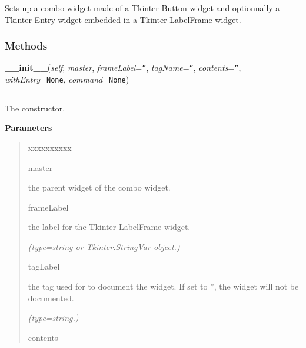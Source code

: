 Sets up a combo widget made of a Tkinter Button widget and optionnally a 
Tkinter Entry widget embedded in a Tkinter LabelFrame widget.



  \subsubsection{Methods}

    \vspace{0.5ex}

\hspace{.8\funcindent}\begin{boxedminipage}{\funcwidth}

    \raggedright \textbf{\_\_init\_\_}(\textit{self}, \textit{master}, \textit{frameLabel}={\tt ''}, \textit{tagName}={\tt ''}, \textit{contents}={\tt ''}, \textit{withEntry}={\tt None}, \textit{command}={\tt None})

    \vspace{-1.5ex}

    \rule{\textwidth}{0.5\fboxrule}
\setlength{\parskip}{2ex}
    The constructor.

\setlength{\parskip}{1ex}
      \textbf{Parameters}
      \vspace{-1ex}

      \begin{quote}
        \begin{Ventry}{xxxxxxxxxx}

          \item[master]

          the parent widget of the combo widget.

          \item[frameLabel]

          the label for the Tkinter LabelFrame widget.

            {\it (type=string or Tkinter.StringVar object.)}

          \item[tagLabel]

          the tag used for to document the widget. If set to '', the widget
          will not be documented.

            {\it (type=string.)}

          \item[contents]


\end{Ventry}
\end{quote}
\end{boxedminipage}
